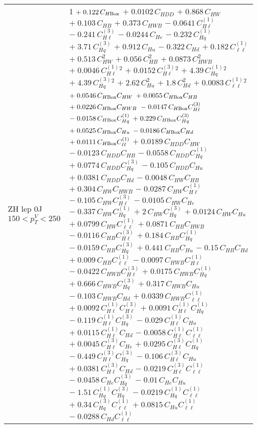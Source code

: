\begin{tabular}{l|p{}}
    ZH lep 0J $150 < p_{T}^{V} < 250$ & 1 $+\;0.122\,C_{H\rm{Box}}$ $+\;0.0102\,C_{HDD}$ $+\;0.868\,C_{HW}$ $+\;0.103\,C_{HB}$ $+\;0.373\,C_{HWB}$ $-\;0.0641\,C^{(1)}_{H\ell}$ $-\;0.241\,C^{(3)}_{H\ell}$ $-\;0.0244\,C_{He}$ $-\;0.232\,C^{(1)}_{Hq}$ $+\;3.71\,C^{(3)}_{Hq}$ $+\;0.912\,C_{Hu}$ $-\;0.322\,C_{Hd}$ $+\;0.182\,C^{(1)}_{\ell\ell}$ $+\;0.513\,C_{HW}^{2}$ $+\;0.056\,C_{HB}^{2}$ $+\;0.0873\,C_{HWB}^{2}$ $+\;0.0046\,C^{(1)}_{H\ell}^{2}$ $+\;0.0152\,C^{(3)}_{H\ell}^{2}$ $+\;4.39\,C^{(1)}_{Hq}^{2}$ $+\;4.39\,C^{(3)}_{Hq}^{2}$ $+\;2.62\,C_{Hu}^{2}$ $+\;1.8\,C_{Hd}^{2}$ $+\;0.0083\,C^{(1)}_{\ell\ell}^{2}$ $+\;0.0546\,C_{H\rm{Box}}C_{HW}$ $+\;0.0055\,C_{H\rm{Box}}C_{HB}$ $+\;0.0226\,C_{H\rm{Box}}C_{HWB}$ $-\;0.0147\,C_{H\rm{Box}}C^{(3)}_{H\ell}$ $-\;0.0158\,C_{H\rm{Box}}C^{(1)}_{Hq}$ $+\;0.229\,C_{H\rm{Box}}C^{(3)}_{Hq}$ $+\;0.0525\,C_{H\rm{Box}}C_{Hu}$ $-\;0.0186\,C_{H\rm{Box}}C_{Hd}$ $+\;0.0111\,C_{H\rm{Box}}C^{(1)}_{\ell\ell}$ $+\;0.0189\,C_{HDD}C_{HW}$ $-\;0.0123\,C_{HDD}C_{HB}$ $-\;0.0558\,C_{HDD}C^{(1)}_{Hq}$ $+\;0.0774\,C_{HDD}C^{(3)}_{Hq}$ $-\;0.105\,C_{HDD}C_{Hu}$ $+\;0.0381\,C_{HDD}C_{Hd}$ $-\;0.0048\,C_{HW}C_{HB}$ $+\;0.304\,C_{HW}C_{HWB}$ $-\;0.0287\,C_{HW}C^{(1)}_{H\ell}$ $-\;0.105\,C_{HW}C^{(3)}_{H\ell}$ $-\;0.0105\,C_{HW}C_{He}$ $-\;0.337\,C_{HW}C^{(1)}_{Hq}$ $+\;2\,C_{HW}C^{(3)}_{Hq}$ $+\;0.0124\,C_{HW}C_{Hu}$ $+\;0.0799\,C_{HW}C^{(1)}_{\ell\ell}$ $+\;0.0871\,C_{HB}C_{HWB}$ $-\;0.0116\,C_{HB}C^{(3)}_{H\ell}$ $+\;0.184\,C_{HB}C^{(1)}_{Hq}$ $-\;0.0159\,C_{HB}C^{(3)}_{Hq}$ $+\;0.441\,C_{HB}C_{Hu}$ $-\;0.15\,C_{HB}C_{Hd}$ $+\;0.009\,C_{HB}C^{(1)}_{\ell\ell}$ $-\;0.0097\,C_{HWB}C^{(1)}_{H\ell}$ $-\;0.0422\,C_{HWB}C^{(3)}_{H\ell}$ $+\;0.0175\,C_{HWB}C^{(1)}_{Hq}$ $+\;0.666\,C_{HWB}C^{(3)}_{Hq}$ $+\;0.317\,C_{HWB}C_{Hu}$ $-\;0.103\,C_{HWB}C_{Hd}$ $+\;0.0339\,C_{HWB}C^{(1)}_{\ell\ell}$ $+\;0.0092\,C^{(1)}_{H\ell}C^{(3)}_{H\ell}$ $+\;0.0091\,C^{(1)}_{H\ell}C^{(1)}_{Hq}$ $-\;0.119\,C^{(1)}_{H\ell}C^{(3)}_{Hq}$ $-\;0.029\,C^{(1)}_{H\ell}C_{Hu}$ $+\;0.0115\,C^{(1)}_{H\ell}C_{Hd}$ $-\;0.0058\,C^{(1)}_{H\ell}C^{(1)}_{\ell\ell}$ $+\;0.0045\,C^{(3)}_{H\ell}C_{He}$ $+\;0.0295\,C^{(3)}_{H\ell}C^{(1)}_{Hq}$ $-\;0.449\,C^{(3)}_{H\ell}C^{(3)}_{Hq}$ $-\;0.106\,C^{(3)}_{H\ell}C_{Hu}$ $+\;0.0381\,C^{(3)}_{H\ell}C_{Hd}$ $-\;0.0219\,C^{(3)}_{H\ell}C^{(1)}_{\ell\ell}$ $-\;0.0458\,C_{He}C^{(3)}_{Hq}$ $-\;0.01\,C_{He}C_{Hu}$ $-\;1.51\,C^{(1)}_{Hq}C^{(3)}_{Hq}$ $-\;0.0219\,C^{(1)}_{Hq}C^{(1)}_{\ell\ell}$ $+\;0.34\,C^{(3)}_{Hq}C^{(1)}_{\ell\ell}$ $+\;0.0815\,C_{Hu}C^{(1)}_{\ell\ell}$ $-\;0.0288\,C_{Hd}C^{(1)}_{\ell\ell}$ \\

\end{tabular}
